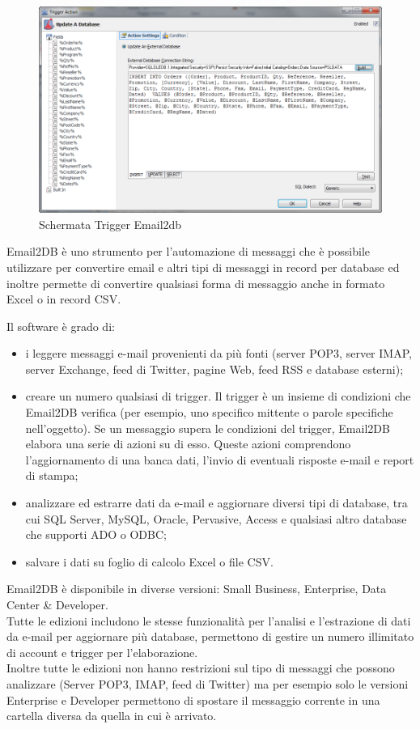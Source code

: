 \begin{figure}[H]
\centering 
\includegraphics[scale=0.6]{img/email2db.png} 
\caption{Schermata Trigger Email2db}
\end{figure}

Email2DB è uno strumento per l'automazione di messaggi che è possibile utilizzare per convertire email e altri tipi di messaggi in record per database ed inoltre permette di convertire qualsiasi forma di messaggio anche in formato Excel o in record CSV.

Il software è grado di:
\begin{itemize}
\item i leggere messaggi e-mail provenienti da più fonti (server POP3, server IMAP, server Exchange, feed di Twitter, pagine Web, feed RSS e database esterni);
\item creare un numero qualsiasi di trigger. Il trigger è un insieme di condizioni che Email2DB verifica (per esempio, uno specifico mittente o parole specifiche nell'oggetto). Se un messaggio supera le condizioni del trigger, Email2DB elabora una serie di azioni su di esso. Queste azioni comprendono l'aggiornamento di una banca dati, l'invio di eventuali risposte e-mail e report di stampa;
\item analizzare ed estrarre dati da e-mail e aggiornare diversi tipi di database, tra cui SQL Server, MySQL, Oracle, Pervasive, Access e qualsiasi altro database che supporti ADO o ODBC;
\item salvare i dati su foglio di calcolo Excel o file CSV.
\end{itemize}

Email2DB è disponibile in diverse versioni: Small Business, Enterprise, Data Center \& Developer.\\
Tutte le edizioni includono le stesse funzionalità per l'analisi e l'estrazione di dati da e-mail per aggiornare più database, permettono di gestire un numero illimitato di account e trigger per l'elaborazione.\\
Inoltre tutte le edizioni non hanno restrizioni sul tipo di messaggi che possono analizzare (Server POP3, IMAP, feed di Twitter) ma per esempio solo le versioni Enterprise e Developer permettono di spostare il messaggio corrente in una cartella diversa da quella in cui è arrivato.

